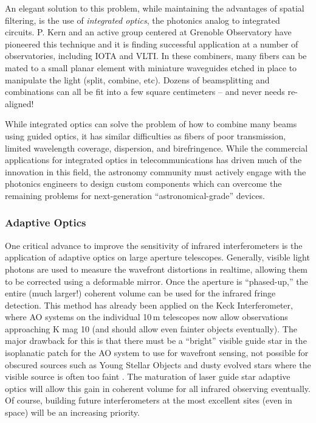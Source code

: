 \documentclass[12pt]{iopart}
\begin{document}
An elegant solution to this problem, while maintaining the advantages
of spatial filtering, is the use of {\em integrated optics}, the
photonics analog to integrated circuits.  P. Kern and an active group
centered at Grenoble Observatory have pioneered this technique
\citep[e.g.,][]{kern1997,malbet1999, berger1999} and it is finding
successful application at a number of observatories, including IOTA
\citep{berger2001} and VLTI. In these combiners, many fibers can be
mated to a small planar element with miniature waveguides etched
in place to manipulate the light (split, combine, etc).  Dozens of
beamsplitting and combinations can all be fit into a few square
centimeters -- and never needs re-aligned!

While integrated optics can solve the problem of how to combine many
beams using guided optics, it has similar difficulties as fibers of
poor transmission, limited wavelength coverage, dispersion, and
birefringence.  While the commercial applications for integrated
optics in telecommunications has driven much of the innovation in this
field, the astronomy community must actively engage with the photonics
engineers to design custom components which can overcome the remaining
problems for next-generation ``astronomical-grade'' devices.

\subsubsection{Adaptive Optics}
One critical advance to improve the sensitivity of infrared
interferometers is the application of adaptive optics on large
aperture telescopes.  Generally, visible light photons are used to
measure the wavefront distortions in realtime, allowing them to be
corrected using a deformable mirror.  Once the aperture is
``phased-up,'' the entire (much larger!) coherent volume can be used
for the infrared fringe detection. This method has already been
applied on the Keck Interferometer, where AO systems on the individual
10\,m telescopes now allow observations approaching K mag 10
(and should allow even fainter objects eventually).  The major
drawback for this is that there must be a ``bright'' visible guide
star in the isoplanatic patch for the AO system to use for wavefront
sensing, not possible for obscured sources such as Young Stellar
Objects and dusty evolved stars where the visible source is often too
faint \citep[a few AO systems do have infrared wavefront sensors to
mitigate this problem, e.g.][]{naos2002}.  The maturation of laser
guide star adaptive optics will allow this gain in coherent volume for
all infrared observing eventually.  Of course, building future
interferometers at the most excellent sites (even in space) will be an
increasing priority.
\end{document}
